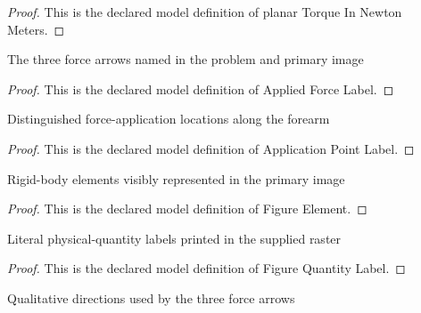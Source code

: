 \begin{proof}
  This is the declared model definition of planar Torque In Newton Meters.
\end{proof}
\begin{definition}
  \label{def:physics:phyx-mini-0707:phyxminiproblems-problemphyxmini0707-appliedforcelabel}
  The three force arrows named in the problem and primary image
\end{definition}
\begin{proof}
  This is the declared model definition of Applied Force Label.
\end{proof}
\begin{definition}
  \label{def:physics:phyx-mini-0707:phyxminiproblems-problemphyxmini0707-applicationpointlabel}
  Distinguished force-application locations along the forearm
\end{definition}
\begin{proof}
  This is the declared model definition of Application Point Label.
\end{proof}
\begin{definition}
  \label{def:physics:phyx-mini-0707:phyxminiproblems-problemphyxmini0707-figureelement}
  Rigid-body elements visibly represented in the primary image
\end{definition}
\begin{proof}
  This is the declared model definition of Figure Element.
\end{proof}
\begin{definition}
  \label{def:physics:phyx-mini-0707:phyxminiproblems-problemphyxmini0707-figurequantitylabel}
  Literal physical-quantity labels printed in the supplied raster
\end{definition}
\begin{proof}
  This is the declared model definition of Figure Quantity Label.
\end{proof}
\begin{definition}
  \label{def:physics:phyx-mini-0707:phyxminiproblems-problemphyxmini0707-arrowdirection}
  Qualitative directions used by the three force arrows
\end{definition}
